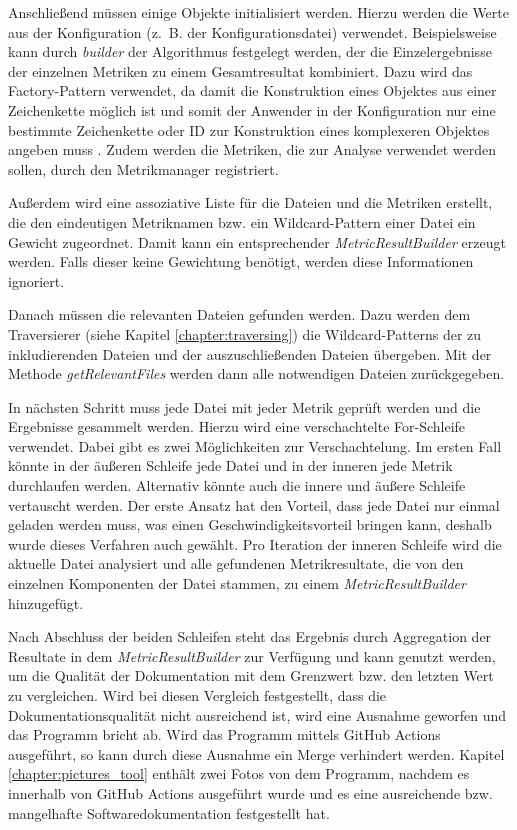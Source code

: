 Anschließend müssen einige Objekte  initialisiert werden. Hierzu werden die Werte aus der Konfiguration (z.~B. der Konfigurationsdatei) verwendet. Beispielsweise kann durch \textit{builder} der Algorithmus festgelegt werden, der die Einzelergebnisse der einzelnen Metriken zu einem Gesamtresultat kombiniert. Dazu wird das Factory-Pattern verwendet, da damit die Konstruktion eines Objektes aus einer Zeichenkette möglich ist und somit der Anwender in der Konfiguration nur eine bestimmte Zeichenkette oder ID zur Konstruktion eines komplexeren Objektes angeben muss \cite[S.~149-161]{gamma2015design}. Zudem werden die Metriken, die zur Analyse verwendet werden sollen, durch den Metrikmanager registriert.

Außerdem wird eine assoziative Liste für die Dateien und die Metriken erstellt, die den eindeutigen Metriknamen bzw. ein Wildcard-Pattern einer Datei ein Gewicht zugeordnet. Damit kann ein entsprechender \textit{MetricResultBuilder} erzeugt werden. Falls dieser keine Gewichtung benötigt, werden diese Informationen ignoriert. 

Danach müssen die relevanten Dateien gefunden werden. Dazu werden dem Traversierer (siehe Kapitel \ref{chapter:traversing}) die Wildcard-Patterns der zu inkludierenden Dateien und der auszuschließenden Dateien übergeben. Mit der Methode \textit{getRelevantFiles} werden dann alle notwendigen Dateien zurückgegeben.

In nächsten Schritt muss jede Datei mit jeder Metrik geprüft werden und die Ergebnisse gesammelt werden. Hierzu wird eine verschachtelte For-Schleife verwendet. Dabei gibt es zwei Möglichkeiten zur Verschachtelung. Im ersten Fall könnte in der äußeren Schleife jede Datei und in der inneren jede Metrik durchlaufen werden. Alternativ könnte auch die innere und äußere Schleife vertauscht werden. Der erste Ansatz hat den Vorteil, dass jede Datei nur einmal geladen werden muss, was einen Geschwindigkeitsvorteil bringen kann, deshalb wurde dieses Verfahren auch gewählt. Pro Iteration der inneren Schleife wird die aktuelle Datei analysiert und alle gefundenen Metrikresultate, die von den einzelnen Komponenten der Datei stammen, zu einem \textit{MetricResultBuilder} hinzugefügt.

Nach Abschluss der beiden Schleifen steht das Ergebnis durch Aggregation der Resultate in dem \textit{MetricResultBuilder} zur Verfügung und kann genutzt werden, um die Qualität der Dokumentation mit dem Grenzwert bzw. den letzten Wert zu vergleichen. Wird bei diesen Vergleich festgestellt, dass die Dokumentationsqualität nicht ausreichend ist, wird eine Ausnahme geworfen und das Programm bricht ab. Wird das Programm mittels GitHub Actions ausgeführt, so kann durch diese Ausnahme ein Merge verhindert werden. Kapitel \ref{chapter:pictures_tool} enthält zwei Fotos von dem Programm, nachdem es innerhalb von GitHub Actions ausgeführt wurde und es eine ausreichende bzw. mangelhafte Softwaredokumentation festgestellt hat. 

